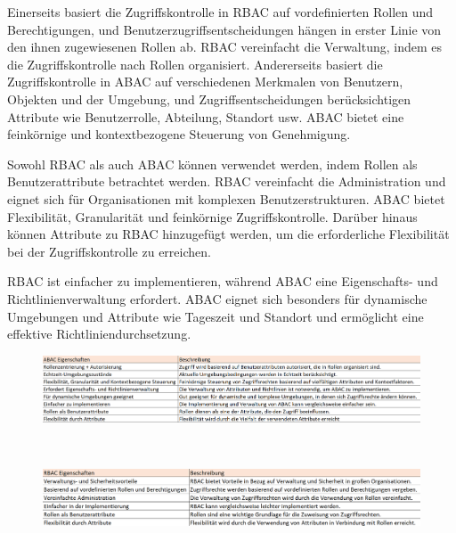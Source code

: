Einerseits basiert die Zugriffskontrolle in RBAC auf vordefinierten Rollen und Berechtigungen, und Benutzerzugriffsentscheidungen hängen in erster Linie von den ihnen zugewiesenen Rollen ab. RBAC vereinfacht die Verwaltung, indem es die Zugriffskontrolle nach Rollen organisiert. Andererseits basiert die Zugriffskontrolle in ABAC auf verschiedenen Merkmalen von Benutzern, Objekten und der Umgebung, und Zugriffsentscheidungen berücksichtigen Attribute wie Benutzerrolle, Abteilung, Standort usw. ABAC bietet eine feinkörnige und kontextbezogene Steuerung von Genehmigung.

Sowohl RBAC als auch ABAC können verwendet werden, indem Rollen als Benutzerattribute betrachtet werden. RBAC vereinfacht die Administration und eignet sich für Organisationen mit komplexen Benutzerstrukturen. ABAC bietet Flexibilität, Granularität und feinkörnige Zugriffskontrolle. Darüber hinaus können Attribute zu RBAC hinzugefügt werden, um die erforderliche Flexibilität bei der Zugriffskontrolle zu erreichen.

RBAC ist einfacher zu implementieren, während ABAC eine Eigenschafts- und Richtlinienverwaltung erfordert. ABAC eignet sich besonders für dynamische Umgebungen und Attribute wie Tageszeit und Standort und ermöglicht eine effektive Richtliniendurchsetzung\cite{coyne2013abac}\cite{ameer2022hybrid}.

\begin{figure}[h]
  \centering
  \includegraphics[scale=0.64]{resources/pic(2).png}
  \caption{}
  \label{fig:vergleich6}
\end{figure}\

\begin{figure}[h]
  \centering
  \includegraphics[scale=0.7]{resources/pic(3).png}
  \caption{}
  \label{fig:vergleich7}
\end{figure}\


